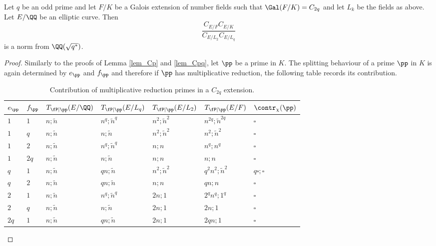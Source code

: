 \begin{lemma}\label{lem_C2p}
    Let $q$ be an odd prime and let $F/K$ be a Galois extension of number fields such that $\Gal(F/K)=C_{2q}$ and let $L_k$ be the fields as above. Let $E/\QQ$ be an elliptic curve. Then
    $$\frac{C_{E/F}C_{E/K}}{C_{E/L_2}C_{E/L_q}}$$
    is a norm from $\QQ(\sqrt{q^*})$.
\end{lemma}

\begin{proof}
    Similarly to the proofs of Lemma \ref{lem_Cp} and \ref{lem_Cpq}, let $\pp$ be a prime in $K$. The splitting behaviour of a prime $\pp$ in $K$ is again determined by $e_\pp$ and $f_\pp$ and therefore if $\pp$ has multiplicative reduction, the following table records its contribution.

    \begin{table}[!ht]
        \centering
        \begin{tabular}{|l|l|l|l|l|l|l|}
        \hline
        $e_\pp$ & $f_\pp$  & $T_{\fP\mid \pp}(E/\QQ)$ & $T_{\fP\mid \pp}(E/L_q)$ & $T_{\fP\mid \pp}(E/L_2)$ & $T_{\fP\mid \pp}(E/F)$ & $\contr_\chi(\pp)$ \\ \hline
        $1$ & $1$ & $n;\tilde{n}$ & $n^q;\tilde{n}^q$ & $n^2;\tilde{n}^2$ & $n^{2q};\tilde{n}^{2q}$ & $\square$ \\ \hline
        $1$ & $q$ & $n;\tilde{n}$ & $n;\tilde{n}$ & $n^2;\tilde{n}^2$ & $n^2;\tilde{n}^2$ & $\square$ \\ \hline
        $1$ & $2$ & $n;\tilde{n}$ & $n^q;\tilde{n}^q$ & $n;n$ & $n^q;n^q$ & $\square$ \\ \hline
        $1$ & $2q$ & $n;\tilde{n}$ & $n;\tilde{n}$ & $n;n$ & $n;n$ & $\square$ \\ \hline
        $q$ & $1$ & $n;\tilde{n}$ & $qn;\tilde{n}$ & $n^2;\tilde{n}^2$ & $q^2n^2;\tilde{n}^2$ & $q\square;\square$ \\ \hline
        $q$ & $2$ & $n;\tilde{n}$ & $qn;\tilde{n}$ & $n;n$ & $qn;n$ & $\square$ \\ \hline
        $2$ & $1$ & $n;\tilde{n}$ & $n^q;\tilde{n}^q$ & $2n;1$ & $2^qn^q;1^q$ & $\square$ \\ \hline
        $2$ & $q$ & $n;\tilde{n}$ & $n;\tilde{n}$ & $2n;1$ & $2n;1$ & $\square$ \\ \hline
        $2q$ & $1$ & $n;\tilde{n}$ & $qn;\tilde{n}$ & $2n;1$ & $2qn;1$ & $\square$ \\ \hline
        \end{tabular}
        \caption{Contribution of multiplicative reduction primes in a $C_{2q}$ extension.}
    \end{table}


\end{proof}
